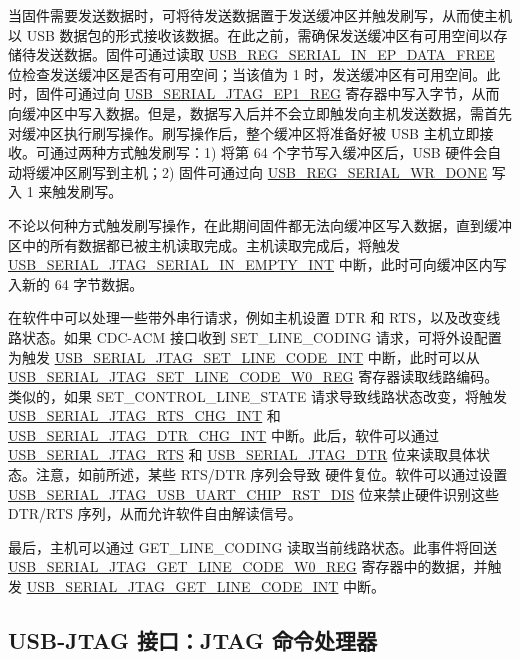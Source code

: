\documentclass[main\_\_CN.tex]{subfiles}
\begin{document}
当固件需要发送数据时，可将待发送数据置于发送缓冲区并触发刷写，从而使主机以 USB 数据包的形式接收该数据。在此之前，需确保发送缓冲区有可用空间以存储待发送数据。固件可通过读取 \hyperref[fielddesc:USBSERIALJTAGSERIALINEPDATAFREE]{USB\_REG\_SERIAL\_IN\_EP\_DATA\_FREE} 位检查发送缓冲区是否有可用空间；当该值为 1 时，发送缓冲区有可用空间。此时，固件可通过向 \hyperref[fielddesc:USBSERIALJTAGRDWRBYTE]{USB\_SERIAL\_JTAG\_EP1\_REG} 寄存器中写入字节，从而向缓冲区中写入数据。但是，数据写入后并不会立即触发向主机发送数据，需首先对缓冲区执行刷写操作。刷写操作后，整个缓冲区将准备好被 USB 主机立即接收。可通过两种方式触发刷写：1) 将第 64 个字节写入缓冲区后，USB 硬件会自动将缓冲区刷写到主机；2) 固件可通过向 \hyperref[fielddesc:USBSERIALJTAGWRDONE]{USB\_REG\_SERIAL\_WR\_DONE} 写入 1 来触发刷写。

不论以何种方式触发刷写操作，在此期间固件都无法向缓冲区写入数据，直到缓冲区中的所有数据都已被主机读取完成。主机读取完成后，将触发 \hyperref[fielddesc:USBSERIALJTAGSERIALINEMPTYINTRAW]{USB\_SERIAL\_JTAG\_SERIAL\_IN\_EMPTY\_INT} 中断，此时可向缓冲区内写入新的 64 字节数据。

在软件中可以处理一些带外串行请求，例如主机设置 DTR 和 RTS，以及改变线路状态。如果 CDC-ACM 接口收到 SET\_LINE\_CODING 请求，可将外设配置为触发 \hyperref[int:USBSERIALJTAGSETLINECODEINT]{USB\_SERIAL\_JTAG\_SET\_LINE\_CODE\_INT} 中断，此时可以从 \hyperref[regdesc:USBSERIALJTAGSETLINECODEW0REG]{USB\_SERIAL\_JTAG\_SET\_LINE\_CODE\_W0\_REG} 寄存器读取线路编码。类似的，如果 SET\_CONTROL\_LINE\_STATE 请求导致线路状态改变，将触发 \hyperref[int:USBSERIALJTAGRTSCHGINT]{USB\_SERIAL\_JTAG\_RTS\_CHG\_INT} 和 \hyperref[int:USBSERIALJTAGDTRCHGINT]{USB\_SERIAL\_JTAG\_DTR\_CHG\_INT} 中断。此后，软件可以通过 \hyperref[fielddesc:USBSERIALJTAGRTS]{USB\_SERIAL\_JTAG\_RTS} 和 \hyperref[fielddesc:USBSERIALJTAGDTR]{USB\_SERIAL\_JTAG\_DTR} 位来读取具体状态。注意，如前所述，某些 RTS/DTR 序列会导致 \chipname{} 硬件复位。软件可以通过设置 \hyperref[fielddesc:USBSERIALJTAGUSBUARTCHIPRSTDIS]{USB\_SERIAL\_JTAG\_USB\_UART\_CHIP\_RST\_DIS} 位来禁止硬件识别这些 DTR/RTS 序列，从而允许软件自由解读信号。

最后，主机可以通过 GET\_LINE\_CODING 读取当前线路状态。此事件将回送 \hyperref[regdesc:USBSERIALJTAGGETLINECODEW0REG]{USB\_SERIAL\_JTAG\_GET\_LINE\_CODE\_W0\_REG} 寄存器中的数据，并触发 \hyperref[int:USBSERIALJTAGGETLINECODEINT]{USB\_SERIAL\_JTAG\_GET\_LINE\_CODE\_INT} 中断。

\subsection{USB-JTAG 接口：JTAG 命令处理器}
\end{document}
